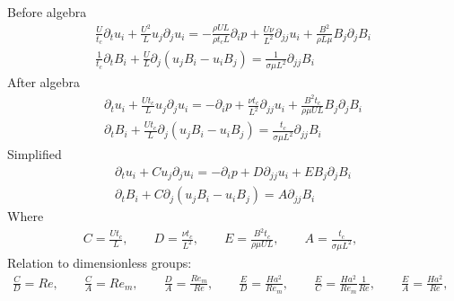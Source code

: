 \documentclass[11pt]{article}
\newcommand{\PD}{\partial}
\begin{document}
Before algebra
\begin{equation}\begin{aligned}
\frac{U}{t_c} \PD_t u_i+ \frac{U^2}{L} u_j\PD_j u_i =-\frac{\rho U L}{\rho t_c L}\PD_i p+ \frac{U \nu}{L^2} \PD_{jj} u_i + \frac{B^2}{\rho L \mu} B_j \PD_j B_i \\
\frac{1}{t_c} \PD_t B_i + \frac{U}{L} \PD_j (u_j B_i - u_i B_j) = \frac{1}{\sigma \mu L^2} \PD_{jj} B_i
\end{aligned} \end{equation}
After algebra
\begin{equation}\begin{aligned}
\PD_t u_i+ \frac{U t_c}{L} u_j\PD_j u_i =-\PD_i p + \frac{\nu t_c}{L^2} \PD_{jj} u_i + \frac{B^2 t_c}{\rho \mu U L} B_j \PD_j B_i \\
\PD_t B_i + \frac{U t_c}{L} \PD_j (u_j B_i - u_i B_j) = \frac{t_c}{\sigma \mu L^2} \PD_{jj} B_i
\end{aligned} \end{equation}
Simplified
\begin{equation}\boxed{\begin{aligned}
\PD_t u_i+ C u_j\PD_j u_i = - \PD_i p+ D \PD_{jj} u_i + E B_j \PD_j B_i \\
\PD_t B_i + C \PD_j (u_j B_i - u_i B_j) = A \PD_{jj} B_i
\end{aligned}}\end{equation}
Where
\begin{equation}\boxed{\begin{aligned}
	C = \frac{U t_c}{L}, \qquad
	D = \frac{\nu t_c}{L^2}, \qquad
	E = \frac{B^2 t_c}{\rho \mu U L}, \qquad
	A = \frac{t_c}{\sigma \mu L^2}, \qquad
\end{aligned}}\end{equation}
Relation to dimensionless groups:
\begin{equation}\begin{aligned}
	\frac{C}{D} = Re, \qquad
	\frac{C}{A} = Re_m, \qquad
	\frac{D}{A} = \frac{Re_m}{Re}, \qquad
	\frac{E}{D} = \frac{Ha^2}{Re_m}, \qquad
	\frac{E}{C} = \frac{Ha^2}{Re_m} \frac{1}{Re}, \qquad
	\frac{E}{A} = \frac{Ha^2}{Re}, \qquad
\end{aligned} \end{equation}
\end{document}
